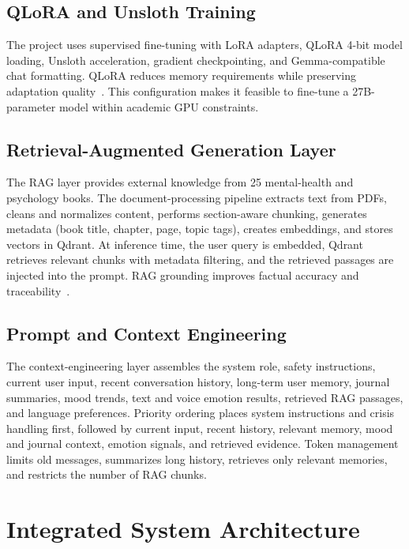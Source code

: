 \documentclass[12pt,a4paper,oneside,openany]{report}
\begin{document}
\subsection{QLoRA and Unsloth Training}

The project uses supervised fine-tuning with LoRA adapters, QLoRA 4-bit model loading, Unsloth acceleration, gradient checkpointing, and Gemma-compatible chat formatting. QLoRA reduces memory requirements while preserving adaptation quality~\cite{dettmers2022qlora,hu2021lora}. This configuration makes it feasible to fine-tune a 27B-parameter model within academic GPU constraints.

\subsection{Retrieval-Augmented Generation Layer}

The RAG layer provides external knowledge from 25 mental-health and psychology books. The document-processing pipeline extracts text from PDFs, cleans and normalizes content, performs section-aware chunking, generates metadata (book title, chapter, page, topic tags), creates embeddings, and stores vectors in Qdrant. At inference time, the user query is embedded, Qdrant retrieves relevant chunks with metadata filtering, and the retrieved passages are injected into the prompt. RAG grounding improves factual accuracy and traceability~\cite{lewis2020rag}.

\subsection{Prompt and Context Engineering}

The context-engineering layer assembles the system role, safety instructions, current user input, recent conversation history, long-term user memory, journal summaries, mood trends, text and voice emotion results, retrieved RAG passages, and language preferences. Priority ordering places system instructions and crisis handling first, followed by current input, recent history, relevant memory, mood and journal context, emotion signals, and retrieved evidence. Token management limits old messages, summarizes long history, retrieves only relevant memories, and restricts the number of RAG chunks.

\section{Integrated System Architecture}
\end{document}
